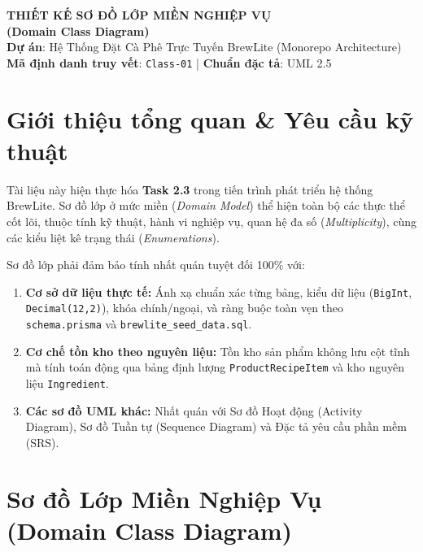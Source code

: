 \documentclass[12pt,a4paper]{article}
\begin{document}
\begin{center}
    {\LARGE \textbf{\textcolor{brandblue}{THIẾT KẾ SƠ ĐỒ LỚP MIỀN NGHIỆP VỤ}}}\\[0.3cm]
    {\large \textbf{(Domain Class Diagram)}}\\[0.4cm]
    \textbf{Dự án}: Hệ Thống Đặt Cà Phê Trực Tuyến BrewLite (Monorepo Architecture)\\[0.1cm]
    \textbf{Mã định danh truy vết}: \texttt{Class-01} \quad | \quad \textbf{Chuẩn đặc tả}: UML 2.5
\end{center}

\vspace{0.3cm}

\section{Giới thiệu tổng quan \& Yêu cầu kỹ thuật}

Tài liệu này hiện thực hóa \textbf{Task 2.3} trong tiến trình phát triển hệ thống BrewLite. Sơ đồ lớp ở mức miền (\textit{Domain Model}) thể hiện toàn bộ các thực thể cốt lõi, thuộc tính kỹ thuật, hành vi nghiệp vụ, quan hệ đa số (\textit{Multiplicity}), cùng các kiểu liệt kê trạng thái (\textit{Enumerations}).

\begin{tcolorbox}[colback=lightgray,colframe=brandblue,title=\textbf{Quy tắc ràng buộc nghiệm thu khắt khe (Zero-Contradiction)}]
Sơ đồ lớp phải đảm bảo tính nhất quán tuyệt đối 100\% với:
\begin{enumerate}[leftmargin=*,itemsep=1pt]
    \item \textbf{Cơ sở dữ liệu thực tế:} Ánh xạ chuẩn xác từng bảng, kiểu dữ liệu (\texttt{BigInt}, \texttt{Decimal(12,2)}), khóa chính/ngoại, và ràng buộc toàn vẹn theo \texttt{schema.prisma} và \texttt{brewlite\_seed\_data.sql}.
    \item \textbf{Cơ chế tồn kho theo nguyên liệu:} Tồn kho sản phẩm không lưu cột tĩnh mà tính toán động qua bảng định lượng \texttt{ProductRecipeItem} và kho nguyên liệu \texttt{Ingredient}.
    \item \textbf{Các sơ đồ UML khác:} Nhất quán với Sơ đồ Hoạt động (Activity Diagram), Sơ đồ Tuần tự (Sequence Diagram) và Đặc tả yêu cầu phần mềm (SRS).
\end{enumerate}
\end{tcolorbox}

\section{Sơ đồ Lớp Miền Nghiệp Vụ (Domain Class Diagram)}
\end{document}
